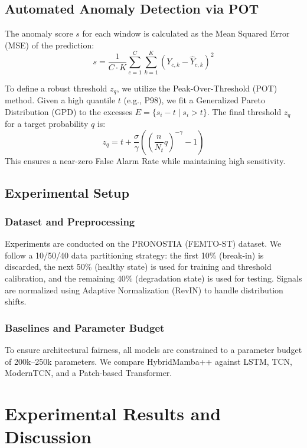 \documentclass{ieeeaccess}
\begin{document}
{\subsection{Automated Anomaly Detection via POT}
\label{sec:pot_method}
The anomaly score $s$ for each window is calculated as the Mean Squared Error (MSE) of the prediction:
\begin{equation}
    s = \frac{1}{C \cdot K} \sum_{c=1}^C \sum_{k=1}^K (Y_{c,k} - \hat{Y}_{c,k})^2
\end{equation}

To define a robust threshold $z_q$, we utilize the Peak-Over-Threshold (POT) method. Given a high quantile $t$ (e.g., P98), we fit a Generalized Pareto Distribution (GPD) to the excesses $E = \{s_i - t \mid s_i > t\}$. The final threshold $z_q$ for a target probability $q$ is:
\begin{equation}
    z_q = t + \frac{\sigma}{\gamma} \left( \left( \frac{n}{N_t} q \right)^{-\gamma} - 1 \right)
\end{equation}
This ensures a near-zero False Alarm Rate while maintaining high sensitivity.

\subsection{Experimental Setup}
\label{sec:exp_setup}

\subsubsection{Dataset and Preprocessing}
Experiments are conducted on the PRONOSTIA (FEMTO-ST) dataset. We follow a 10/50/40 data partitioning strategy: the first 10\% (break-in) is discarded, the next 50\% (healthy state) is used for training and threshold calibration, and the remaining 40\% (degradation state) is used for testing. Signals are normalized using Adaptive Normalization (RevIN) to handle distribution shifts.

\subsubsection{Baselines and Parameter Budget}
To ensure architectural fairness, all models are constrained to a parameter budget of 200k--250k parameters. We compare HybridMamba++ against LSTM, TCN, ModernTCN, and a Patch-based Transformer.

\section{Experimental Results and Discussion}
\label{sec:results}

}
\end{document}
